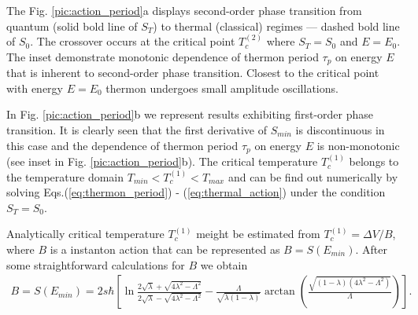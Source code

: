\documentclass[aps, pre, preprint, groupedaddress, superscriptaddress, showkeys, showpacs] {revtex4-1}
\begin{document}
The Fig. \ref{pic:action_period}a displays second-order phase transition from quantum (solid bold line of $S_T$) to thermal (classical) regimes --- dashed bold line of $S_0$.
The crossover occurs at the critical point $T_{c}^{(2)}$ where $S_T = S_0$ and {$E = E_0$}.
The inset demonstrate monotonic dependence of thermon period $\tau_p$ on energy $E$ that is inherent to second-order phase transition.
Closest to the critical point with energy $E=E_0$ thermon undergoes small amplitude oscillations.  
  
In Fig. \ref{pic:action_period}b we represent results exhibiting first-order phase transition.
It is clearly seen that the first derivative of $S_{min}$ is discontinuous in this case and the dependence of thermon period $\tau_p$ on energy $E$ is non-monotonic (see inset in Fig. \ref{pic:action_period}b).
The critical temperature $T_{c}^{(1)}$ belongs to the temperature domain $T_{min} < T_{c}^{(1)} < T_{max}$ and can be find out numerically by solving Eqs.(\ref{eq:thermon_period}) - (\ref{eq:thermal_action}) under the condition $S_T = S_0$.
 
Analytically critical temperature $T_{c}^{(1)}$ meight be estimated from $T_{c}^{(1)} = \Delta V / B$, where $B$ is a instanton action that can be represented as $B = S(E_{min})$.
After some straightforward calculations for $B$ we obtain
%
\begin{equation}
\begin{array}{c}
B = S(E_{min}) = 2 s \hbar \left[ \ln \frac{2 \sqrt{\lambda} + \sqrt{4 \lambda^2 - \Lambda^2}}{2 \sqrt{\lambda} - \sqrt{4 \lambda^2 - \Lambda^2}} - \frac{\Lambda}{\sqrt{\lambda (1 - \lambda)}} \arctan \left( \frac{\sqrt{(1 - \lambda) (4 \lambda^2 - \Lambda^2)}}{\Lambda} \right) \right].
\end{array}
\label{eq:B_action}
\end{equation}
%
\end{document}
